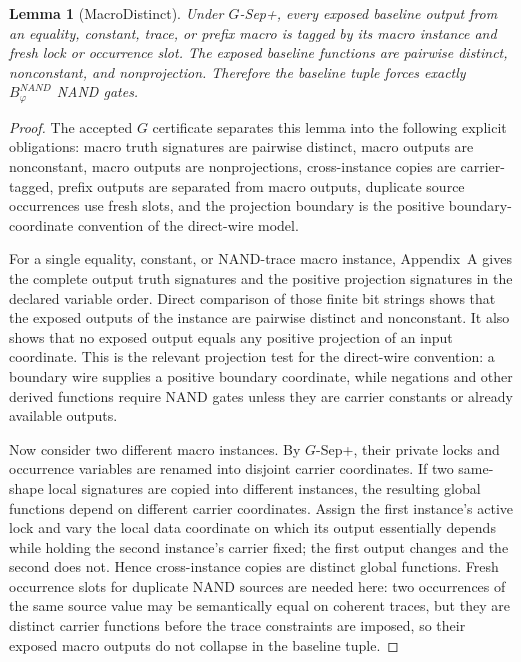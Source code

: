 \documentclass[10.5pt,a4paper]{article}
\newtheorem{lemma}[theorem]{Lemma}
\begin{document}
\begin{lemma}[MacroDistinct]
Under \(G\)-Sep+, every exposed baseline output from an equality, constant, trace, or prefix macro is tagged by
its macro instance and fresh lock or occurrence slot.  The exposed baseline functions are pairwise distinct,
nonconstant, and nonprojection.  Therefore the baseline tuple forces exactly \(B^{NAND}_\varphi\) NAND gates.
\end{lemma}
\begin{proof}
The accepted \(G\) certificate separates this lemma into the following explicit obligations: macro truth signatures
are pairwise distinct, macro outputs are nonconstant, macro outputs are nonprojections, cross-instance copies are
carrier-tagged, prefix outputs are separated from macro outputs, duplicate source occurrences use fresh slots, and
the projection boundary is the positive boundary-coordinate convention of the direct-wire model.

For a single equality, constant, or NAND-trace macro instance, Appendix~A gives the complete output truth
signatures and the positive projection signatures in the declared variable order.  Direct comparison of those
finite bit strings shows that the exposed outputs of the instance are pairwise distinct and nonconstant.  It also
shows that no exposed output equals any positive projection of an input coordinate.  This is the relevant
projection test for the direct-wire convention: a boundary wire supplies a positive boundary coordinate, while
negations and other derived functions require NAND gates unless they are carrier constants or already available
outputs.

Now consider two different macro instances.  By \(G\)-Sep+, their private locks and occurrence variables are
renamed into disjoint carrier coordinates.  If two same-shape local signatures are copied into different instances,
the resulting global functions depend on different carrier coordinates.  Assign the first instance's active lock and
vary the local data coordinate on which its output essentially depends while holding the second instance's carrier
fixed; the first output changes and the second does not.  Hence cross-instance copies are distinct global
functions.  Fresh occurrence slots for duplicate NAND sources are needed here: two occurrences of the same
source value may be semantically equal on coherent traces, but they are distinct carrier functions before the trace
constraints are imposed, so their exposed macro outputs do not collapse in the baseline tuple.


\end{proof}
\end{document}

